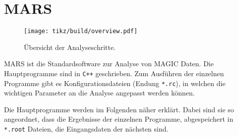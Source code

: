 \section{MARS}%
\label{sec:mars}

\begin{wrapfigure}[31]{r}{0.5\textwidth}
  \centering
  \texttt{[image: tikz/build/overview.pdf]}%
  \caption{Ü\-ber\-sicht der Ana\-lyse\-schrit\-te.}%
  \label{fig:uebersicht_analyse}
\end{wrapfigure}

MARS ist die Standardsoftware zur Analyse von MAGIC Daten.
Die Hauptprogramme sind in \texttt{C++} geschrieben.
Zum Ausführen der einzelnen Programme gibt es Konfigurationsdateien
(Endung \texttt{*.rc}),
in welchen die wichtigen Parameter an die Analyse angepasst werden können.


Die Hauptprogramme werden im Folgenden näher erklärt.
Dabei sind sie so angeordnet,
dass die Ergebnisse der einzelnen Programme,
abgespeichert in \texttt{*.root} Dateien,
die Eingangsdaten der nächsten sind.




% 






